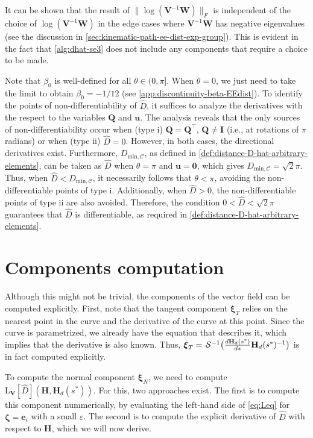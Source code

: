 It can be shown that the result of $\|\log(\mathbf{V}^{-1}\mathbf{W})\|_F$ is independent of the choice of $\log(\mathbf{V}^{-1}\mathbf{W})$ in the edge cases where $\mathbf{V}^{-1}\mathbf{W}$ has negative eigenvalues (see the discussion in \cref{sec:kinematic-path-ee-dist-exp-group}). This is evident in the fact that \cref{alg:dhat-se3} does not include any components that require a choice to be made.

Note that $\beta_0$ is well-defined for all $\theta \in (0,\pi]$. When $\theta=0$, we just need to take the limit to obtain $\beta_0=-1/12$ (see \cref{app:discontinuity-beta-EEdist}). To identify the points of non-differentiability of $\widehat{D}$, it suffices to analyze the derivatives with the respect to the variables $\mathbf{Q}$ and $\mathbf{u}$. The analysis reveals that the only sources of non-differentiability occur when (type i) $\mathbf{Q}=\mathbf{Q}^\top$, $\mathbf{Q} \not= \mathbf{I}$ (i.e., at rotations of $\pi$ radians) or when (type ii) $\widehat{D}=0$. However, in both cases, the directional derivatives exist. Furthermore, $D_{\text{min},\mathcal{C}}$, as defined in \cref{def:distance-D-hat-arbitrary-elements}, can be taken as $\widehat{D}$ when $\theta = \pi$  and $\mathbf{u} = \mathbf{0}$, which gives $D_{\text{min},\mathcal{C}} = \sqrt{2}\pi$. Thus, when $\widehat{D} < D_{\text{min},\mathcal{C}}$, it necessarily follows that $\theta < \pi$, avoiding the non-differentiable points of type i. Additionally, when $\widehat{D} > 0$, the non-differentiable points of type ii are also avoided. Therefore, the condition $0 < \widehat{D} < \sqrt{2}\pi$ guarantees that $\widehat{D}$ is differentiable, as required in \cref{def:distance-D-hat-arbitrary-elements}.
\section{Components computation}
Although this might not be trivial, the components of the vector field can be computed explicitly. First, note that the tangent component $\boldsymbol{\xi}_T$ relies on the nearest point in the curve and the derivative of the curve at this point. Since the curve is parametrized, we already have the equation that describes it, which implies that the derivative is also known. Thus, $\boldsymbol{\xi}_T = \invSL\bigl(\frac{d\mathbf{H}_d(s^*)}{ds}\mathbf{H}_d(s^*)^{-1}\bigr)$ is in fact computed explicitly.

To compute the normal component $\boldsymbol{\xi}_N$, we need to compute $\text{L}_{\mathbf{V}}[\widehat{D}](\mathbf{H}, \mathbf{H}_d(s^*))$. For this, two approaches exist. The first is to compute this component nummerically, by evaluating the left-hand side of \eqref{eq:Leq} for $\boldsymbol{\zeta} = \mathbf{e}_i$ with a small $\varepsilon$. The second is to compute the explicit derivative of $\widehat{D}$ with respect to $\mathbf{H}$, which we will now derive.

